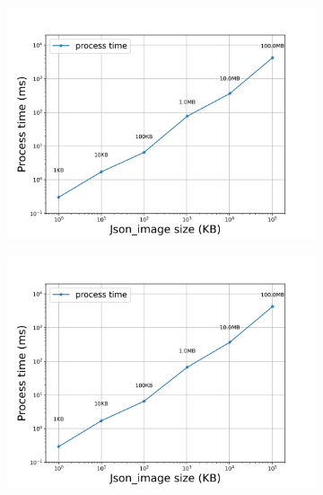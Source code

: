 \begin{figure}[htb]
\begin{subfigure}{0.49\textwidth}
        \caption{} \label{fig: proportional-imagesize-d}
    \end{subfigure}
    \begin{subfigure}{0.49\textwidth}
        \centering
        \includegraphics[width=\textwidth]{figures/tests/proportional_tests/Average_json_image_messages_sending_time_of_100_tests_1KB_to_100MB.png}\hfill 
        \caption{} \label{fig: proportional-imagesize-a}
    \end{subfigure}
    \begin{subfigure}{0.49\textwidth}
        \centering
        \includegraphics[width=\textwidth]{figures/tests/proportional_tests/Average_json_image_messages_receiving_time_of_100_tests_1KB_to_100MB.png}\hfill 
        \caption{} \label{fig: proportional-imagesize-b}
    \end{subfigure}


\end{figure}
